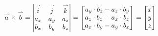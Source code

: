 \documentclass[a4paper, 12pt]{article}
\begin{document}
{\centering
$\overset{\rightharpoonup}{a} \times \overset{\rightharpoonup}{b} =
\begin{vmatrix}
\overset{\rightharpoonup}{i} & \overset{\rightharpoonup}{j} & \overset{\rightharpoonup}{k} \\ 
a_x & a_y & a_z\\ 
b_x & b_y &b_z \notag
\end{vmatrix}=
\begin{bmatrix}
	a_y\cdot b_z - a_z\cdot b_y\\
	a_z\cdot b_x - a_x\cdot b_z\\
	a_x\cdot b_y - a_y\cdot b_x \notag
\end{bmatrix}=
\begin{bmatrix}
	x\\
	y\\
	z \notag
\end{bmatrix}$\par}
\end{document}
